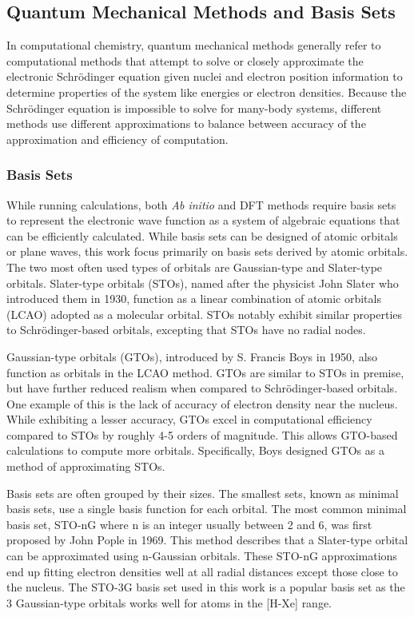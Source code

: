 \subsection{Quantum Mechanical Methods and Basis Sets}

In computational chemistry, quantum mechanical methods generally refer to computational methods that attempt to solve or closely approximate the electronic Schrödinger equation given nuclei and electron position information to determine properties of the system like energies or electron densities.
Because the Schrödinger equation is impossible to solve for many-body systems, different methods use different approximations to balance between accuracy of the approximation and efficiency of computation.

\subsubsection{Basis Sets}

While running calculations, both \textit{Ab initio} and DFT methods require basis sets to represent the electronic wave function as a system of algebraic equations that can be efficiently calculated.
While basis sets can be designed of atomic orbitals or plane waves, this work focus primarily on basis sets derived by atomic orbitals.
The two most often used types of orbitals are Gaussian-type and Slater-type orbitals.
Slater-type orbitals (STOs), named after the physicist John Slater who introduced them in 1930,\cite{SlaterOrbitals} function as a linear combination of atomic orbitals (LCAO) adopted as a molecular orbital. 
STOs notably exhibit similar properties to Schrödinger-based orbitals, excepting that STOs have no radial nodes.

Gaussian-type orbitals (GTOs), introduced by S. Francis Boys in 1950,\cite{GaussianOrbitals} also function as orbitals in the LCAO method.
GTOs are similar to STOs in premise, but have further reduced realism when compared to Schrödinger-based orbitals.
One example of this is the lack of accuracy of electron density near the nucleus.
While exhibiting a lesser accuracy, GTOs excel in computational efficiency compared to STOs by roughly 4-5 orders of magnitude.
This allows GTO-based calculations to compute more orbitals.
Specifically, Boys designed GTOs as a method of approximating STOs.

Basis sets are often grouped by their sizes.
The smallest sets, known as minimal basis sets, use a single basis function for each orbital. 
The most common minimal basis set, STO-nG where n is an integer usually between 2 and 6, was first proposed by John Pople in 1969.\cite{PopleSTO}
This method describes that a Slater-type orbital can be approximated using n-Gaussian orbitals.
These STO-nG approximations end up fitting electron densities well at all radial distances except those close to the nucleus.
The STO-3G basis set used in this work is a popular basis set as the 3 Gaussian-type orbitals works well for atoms in the [H-Xe] range.


